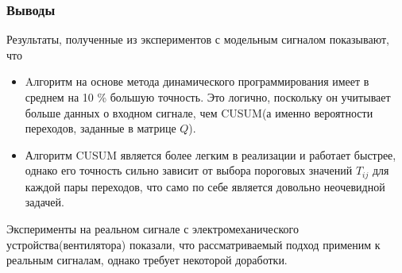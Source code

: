 \documentclass[9pt]{beamer}
\begin{document}
\begin{frame}\frametitle{Выводы}
Результаты, полученные из экспериментов с модельным сигналом показывают, что
\begin{itemize}
\item Aлгоритм на основе метода динамического программирования имеет в среднем на 10 \% большую точность. Это логично, поскольку он учитывает больше данных о входном сигнале, чем CUSUM(а именно вероятности переходов, заданные в матрице $Q$).
\item Алгоритм CUSUM является более легким в реализации и работает быстрее, однако его точность сильно зависит от выбора пороговых значений $T_{ij}$ для каждой пары переходов, что само по себе является довольно неочевидной задачей.
\end{itemize}

Эксперименты на реальном сигнале с электромеханического устройства(вентилятора) показали, что рассматриваемый подход применим к реальным сигналам, однако требует некоторой доработки.
\end{frame}
\end{document}
